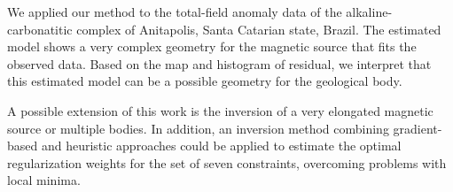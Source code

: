 We applied our method to the total-field anomaly data of the alkaline-carbonatitic complex of Anitapolis, Santa Catarian state, Brazil. The estimated model shows a very complex geometry for the magnetic source that fits the observed data. Based on the map and histogram of residual, we interpret that this estimated model can be a possible geometry for the geological body.

A possible extension of this work is the inversion of a very elongated magnetic source or multiple bodies. In addition, an inversion method combining gradient-based and heuristic approaches could be applied to estimate the optimal regularization weights for the set of seven constraints, overcoming problems with local minima.
